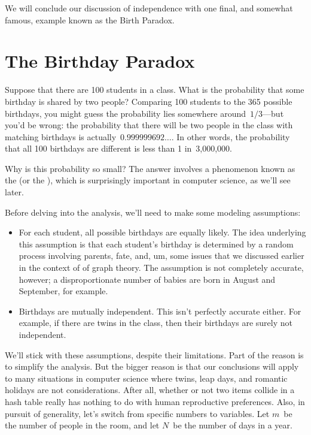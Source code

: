 We will conclude our discussion of independence with one final, and
somewhat famous, example known as the Birth Paradox.

\begin{problems}
\classproblems
{}
\end{problems}


\section{The Birthday Paradox}\label{birthday_principle_sec}

Suppose that there are 100 students in a class.  What is the
probability that some birthday is shared by two people?  Comparing 100
students to the 365 possible birthdays, you might guess the
probability lies somewhere around~$1/3$---but you'd be wrong: the
probability that there will be two people in the class with matching
birthdays is actually~$0.999999692\dots$.  In other words, the
probability that all 100 birthdays are different is less than 1
in~3,000,000.

Why is this probability so small?  The answer involves a phenomenon
known as the  (or the ), which is surprisingly important in computer science, as
we'll see later.

Before delving into the analysis, we'll need to make some modeling
assumptions:
\begin{itemize}

\item
For each student, all possible birthdays are equally likely.  The idea
underlying this assumption is that each student's birthday is
determined by a random process involving parents, fate, and, um, some
issues that we discussed earlier in the context of of graph theory.
The assumption is not completely accurate, however; a disproportionate
number of babies are born in August and September, for example.

\item
Birthdays are mutually independent.  This isn't perfectly accurate
either.  For example, if there are twins in the class, then their
birthdays are surely not independent.

\end{itemize}
We'll stick with these assumptions, despite their limitations.  Part
of the reason is to simplify the analysis.  But the bigger reason is
that our conclusions will apply to many situations in computer science
where twins, leap days, and romantic holidays are not considerations.
After all, whether or not two items collide in a hash table really has
nothing to do with human reproductive preferences.  Also, in pursuit
of generality, let's switch from specific numbers to variables.  Let
$m$~be the number of people in the room, and let $N$~be the number of
days in a year.

